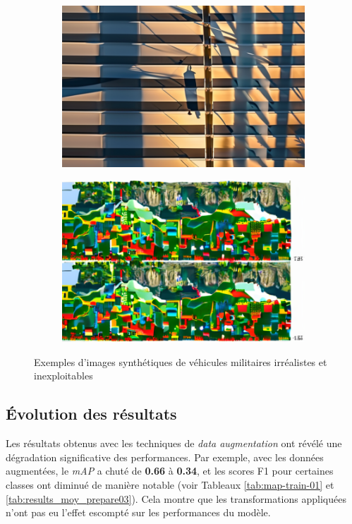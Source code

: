 \begin{figure}[H]
\begin{subfigure}[b]{0.45\textwidth}
        \includegraphics[width=\textwidth]{./images/tank-sunrise_maneuver-1.png}
    \end{subfigure}
    \hfill
    \begin{subfigure}[b]{0.45\textwidth}
        \centering
        \includegraphics[width=\textwidth]{./images/tank-mountain_path-0.png}
    \end{subfigure}
    \caption{Exemples d'images synthétiques de véhicules militaires irréalistes et inexploitables}
\end{figure}


\subsection{Évolution des résultats}

Les résultats obtenus avec les techniques de \textit{data augmentation} ont révélé une dégradation significative des performances.
Par exemple, avec les données augmentées, le \textit{mAP} a chuté de \textbf{0.66} à \textbf{0.34}, et les scores F1 pour certaines classes ont diminué de manière notable (voir Tableaux \ref{tab:map-train-01} et \ref{tab:results_moy_prepare03}).
Cela montre que les transformations appliquées n'ont pas eu l'effet escompté sur les performances du modèle.



